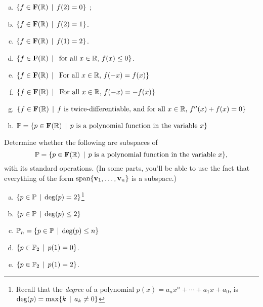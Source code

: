 \begin{prob}
\begin{enumerate}[a)]\medskip
\item  $\{f \in \mathbf{F}(\mathbb{R}) \,\mid \, f(2)=0  \}$ ; \medskip \medskip
%
\item\sov  $\{f \in \mathbf{F}(\mathbb{R}) \,\mid \, f(2)=1  \}$.\medskip \medskip
% 

\item  $\{f \in \mathbf{F}(\mathbb{R}) \,\mid \, f(1)=2  \}$.\medskip \medskip
%
\item\sov  $\{f \in \mathbf{F}(\mathbb{R}) \,\mid \, \text{ for all } x\in \mathbb{R},   \, f(x)\le 0 \}$.\medskip 
%
\item  $\{f \in \mathbf{F}(\mathbb{R}) \,\mid \, \text{ For all } x\in \mathbb{R},   \, f(-x)= f(x) \}$\medskip 
%
\item\sov  $\{f \in \mathbf{F}(\mathbb{R}) \,\mid \, \text{ For all } x\in \mathbb{R},   \, f(-x)= -f(x) \}$\medskip 
%




\item $\{f \in \mathbf{F}(\mathbb{R})   \,\mid \, \text{$f$ is twice-differentiable, and  for all } x\in \mathbb{R},   \, f''(x)+ f(x)=0 \}$ \medskip 
%
 \item\sov $\mathbb{P}=\{p \in \mathbf{F}(\mathbb{R})   \,\mid \, p \text{ is a polynomial function in the variable } x \}$ \medskip 
%
\end{enumerate}


\end{prob} \begin{prob} \label{prob05.3} Determine whether   the following are subspaces of $$\mathbb{P} =\{p \in \mathbf{F}(\mathbb{R})   \,\mid \, p \text{ is a polynomial function in the variable } x \},$$ with its standard operations. (In some parts, you'll be able to use the fact that everything of the form $\textrm{span}\{\mathbf{v}_1, \dots, \mathbf{v}_n\}$  is a subspace.)
 
\medskip
\begin{enumerate}[a)]

\item $\{p \in \mathbb{P}   \,\mid \, \deg(p)=2  \}$\footnote{Recall that the {\it degree} of a polynomial $p(x)=a_n x^n +\cdots +a_1 x +a_0$, is $\deg(p)=\max\{k\,\mid \, a_k\not=0 \}$}   \medskip 
% 

\item\sov $\{p \in \mathbb{P}   \,\mid \, \deg(p)
\le 2  \}$  \medskip 
% 

\item $\mathbb{P}_n= \{p \in \mathbb{P}   \,\mid \,  \deg(p)\le n \}$  \medskip 
%  
 

\item\sov  $ \{p \in \mathbb{P}_2 \,\mid \,  p(1)=0 \}$.  \medskip
%

\item  $ \{p \in \mathbb{P}_2 \,\mid \,  p(1)=2 \}$.  \medskip
%


\end{enumerate}
\end{prob}
